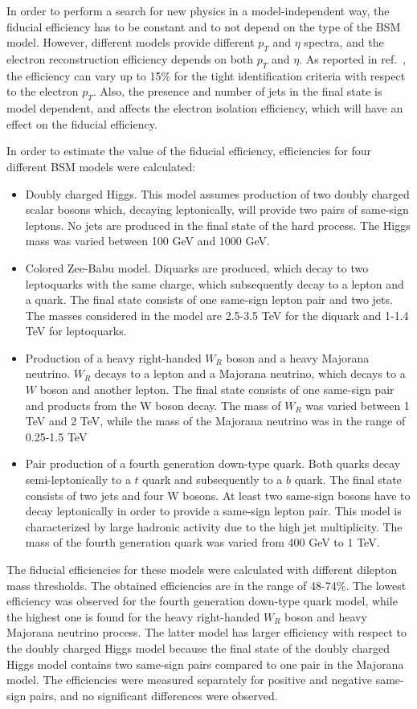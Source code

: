 In order to perform a search for new physics in a model-independent way, the fiducial efficiency has to be constant and to not depend on the type of the BSM model.
However, different models provide different $p_T$ and $\eta$ spectra, and the electron reconstruction efficiency depends on both $p_T$ and $\eta$.
As reported in ref.~\cite{electron_tight}, the efficiency can vary up to 15$\%$ for the tight identification criteria with respect to the electron $p_T$.
Also, the presence and number of jets in the final state is model dependent, and affects the electron isolation efficiency, which will have an effect on 
the fiducial efficiency.

In order to estimate the value of the fiducial efficiency, efficiencies for four different BSM models were calculated:
\begin{itemize}
 \item Doubly charged Higgs. This model assumes production of two doubly charged scalar bosons which, decaying leptonically, will provide two pairs of same-sign leptons.
 No jets are produced in the final state of the hard process. The Higgs mass was varied between 100 GeV and 1000 GeV.
 \item Colored Zee-Babu model. Diquarks are produced, which decay to two leptoquarks with the same charge, 
 which subsequently decay to a lepton and a quark. The final state consists of one same-sign lepton pair and two jets.
 The masses considered in the model are 2.5-3.5 TeV for the diquark and 1-1.4 TeV for leptoquarks.
 \item Production of a heavy right-handed $W_R$ boson and a heavy Majorana neutrino. $W_R$ decays to a lepton and a Majorana neutrino, 
 which decays to a $W$ boson and another lepton. The final state consists of one same-sign pair and products from the W boson decay.
 The mass of $W_R$ was varied between 1 TeV and 2 TeV, while the mass of the Majorana neutrino was in the range of 0.25-1.5 TeV
 \item Pair production of a fourth generation down-type quark. Both quarks decay semi-leptonically to a $t$ quark and subsequently to a $b$ quark.
 The final state consists of two jets and four W bosons. At least two same-sign bosons have to decay leptonically in order to provide a same-sign lepton pair.
 This model is characterized by large hadronic activity due to the high jet multiplicity.
 The mass of the fourth generation quark was varied from 400 GeV to 1 TeV.
\end{itemize}
The fiducial efficiencies for these models were calculated with different dilepton mass thresholds.
The obtained efficiencies are in the range of 48-74$\%$. The lowest efficiency was observed for the fourth generation down-type quark model, while the highest one is found for the heavy right-handed $W_R$ boson and heavy Majorana neutrino process. The latter model has larger efficiency with respect to the doubly charged Higgs model
because the final state of the doubly charged Higgs model contains two same-sign pairs compared to one pair in the Majorana model.
The efficiencies were measured separately for positive and negative same-sign pairs, and no significant differences were observed.

